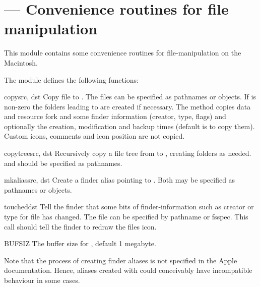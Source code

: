 \section{ ---
         Convenience routines for file manipulation}



This module contains some convenience routines for file-manipulation
on the Macintosh.

The  module defines the following functions:


\begin{funcdesc}{copy}{src, dst}
Copy file  to . The files can be specified as
pathnames or  objects. If  is non-zero
the folders leading to  are created if necessary.
The method copies data and
resource fork and some finder information (creator, type, flags) and
optionally the creation, modification and backup times (default is to
copy them). Custom icons, comments and icon position are not copied.
\end{funcdesc}

\begin{funcdesc}{copytree}{src, dst}
Recursively copy a file tree from  to , creating
folders as needed.  and  should be specified as
pathnames.
\end{funcdesc}

\begin{funcdesc}{mkalias}{src, dst}
Create a finder alias  pointing to . Both may be
specified as pathnames or  objects.
\end{funcdesc}

\begin{funcdesc}{touched}{dst}
Tell the finder that some bits of finder-information such as creator
or type for file  has changed. The file can be specified by
pathname or fsspec. This call should tell the finder to redraw the
files icon.
\end{funcdesc}

\begin{datadesc}{BUFSIZ}
The buffer size for , default 1 megabyte.
\end{datadesc}

Note that the process of creating finder aliases is not specified in
the Apple documentation. Hence, aliases created with 
could conceivably have incompatible behaviour in some cases.


